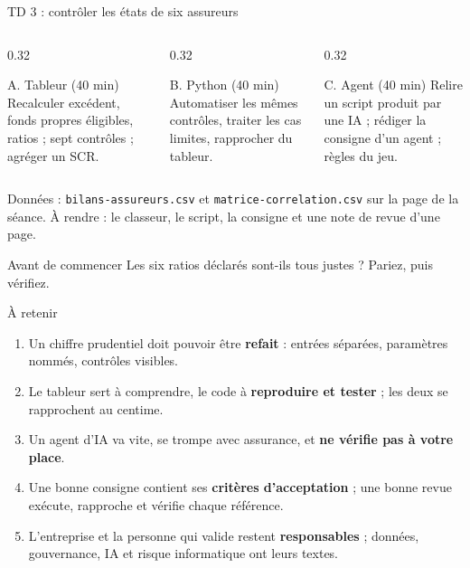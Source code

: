 \documentclass[10pt,aspectratio=169]{beamer}
\newcommand{\fx}[1]{\texttt{\small #1}}
\begin{document}
\begin{frame}{TD 3 : contrôler les états de six assureurs}
\begin{columns}[T]
\begin{column}{0.32\textwidth}
\begin{block}{A. Tableur (40 min)}
\small
Recalculer excédent, fonds propres éligibles, ratios ; sept contrôles ; agréger un SCR.
\end{block}
\end{column}
\begin{column}{0.32\textwidth}
\begin{block}{B. Python (40 min)}
\small
Automatiser les mêmes contrôles, traiter les cas limites, rapprocher du tableur.
\end{block}
\end{column}
\begin{column}{0.32\textwidth}
\begin{block}{C. Agent (40 min)}
\small
Relire un script produit par une IA ; rédiger la consigne d'un agent ; règles du jeu.
\end{block}
\end{column}
\end{columns}
\vspace{0.4cm}
\small Données : \fx{bilans-assureurs.csv} et \fx{matrice-correlation.csv} sur la page de la séance.
À rendre : le classeur, le script, la consigne et une note de revue d'une page.
\begin{alertblock}{Avant de commencer}
Les six ratios déclarés sont-ils tous justes ? Pariez, puis vérifiez.
\end{alertblock}
\end{frame}

\begin{frame}{À retenir}
\begin{enumerate}
  \item Un chiffre prudentiel doit pouvoir être \textbf{refait} : entrées séparées, paramètres nommés, contrôles visibles.
  \item Le tableur sert à comprendre, le code à \textbf{reproduire et tester} ; les deux se rapprochent au centime.
  \item Un agent d'IA va vite, se trompe avec assurance, et \textbf{ne vérifie pas à votre place}.
  \item Une bonne consigne contient ses \textbf{critères d'acceptation} ; une bonne revue exécute, rapproche et vérifie chaque référence.
  \item L'entreprise et la personne qui valide restent \textbf{responsables} ; données, gouvernance, IA et risque informatique ont leurs textes.
\end{enumerate}
\end{frame}
\end{document}
